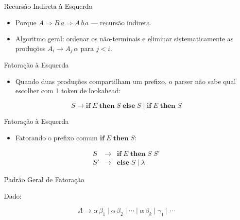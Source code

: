 \begin{frame}{Recursão Indireta à Esquerda}

    \begin{itemize}
        \item
        Porque \(A \Rightarrow B\,a \Rightarrow A\,b\,a\) --- recursão
        indireta.
        \item
        Algoritmo geral: ordenar os não-terminais e eliminar sistematicamente
        as produções \(A_i \to A_j\,\alpha\) para \(j < i\).
    \end{itemize}
\end{frame}

\begin{frame}{Fatoração à Esquerda}

    \begin{itemize}

        \item
        Quando duas produções compartilham um prefixo, o parser não sabe qual
        escolher com 1 token de lookahead:
    \end{itemize}

    \[S \to \mathbf{if}\; E\; \mathbf{then}\; S\; \mathbf{else}\; S \mid \mathbf{if}\; E\; \mathbf{then}\; S\]
\end{frame}

\begin{frame}{Fatoração à Esquerda}

    \begin{itemize}

        \item
        Fatorando o prefixo comum \(\mathbf{if}\; E\; \mathbf{then}\; S\):
    \end{itemize}

    \[\begin{array}{lcl}
    S  &\to& \mathbf{if}\; E\; \mathbf{then}\; S\; S' \\
    S' &\to& \mathbf{else}\; S \mid \lambda
\end{array}\]
\end{frame}

\begin{frame}{Padrão Geral de Fatoração}

    Dado:

    \[A \to \alpha\,\beta_1 \mid \alpha\,\beta_2 \mid \cdots \mid \alpha\,\beta_k \mid \gamma_1 \mid \cdots\]
\end{frame}

